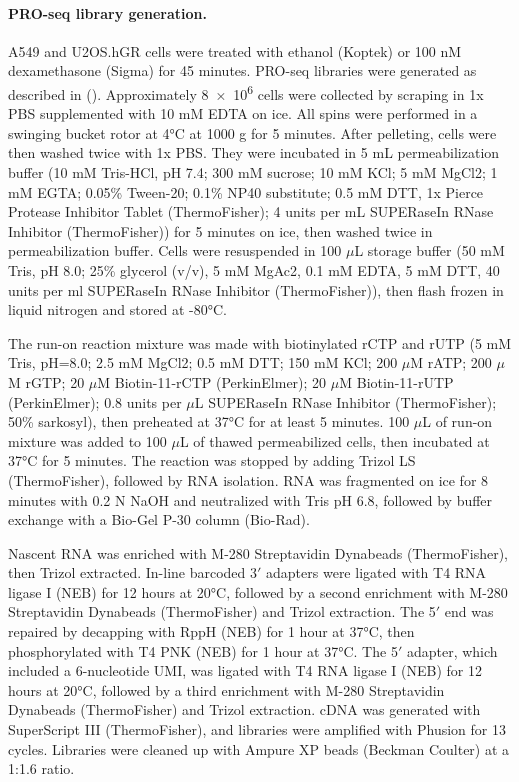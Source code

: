 \documentclass{article}
\begin{document}
{\paragraph{PRO-seq library generation.} A549 and U2OS.hGR cells were treated with ethanol (Koptek) or 100 nM dexamethasone (Sigma) for 45 minutes. PRO-seq libraries were generated as described in (\cite{mahat_base-pair-resolution_2016}). Approximately \num{8e6} cells were collected by scraping in 1x PBS supplemented with 10 mM EDTA on ice. All spins were performed in a swinging bucket rotor at 4°C at 1000 g for 5 minutes. After pelleting, cells were then washed twice with 1x PBS. They were incubated in 5 mL permeabilization buffer (10 mM Tris-HCl, pH 7.4; 300 mM sucrose; 10 mM KCl; 5 mM MgCl2; 1 mM EGTA; 0.05\% Tween-20; 0.1\% NP40 substitute; 0.5 mM DTT, 1x Pierce Protease Inhibitor Tablet (ThermoFisher); 4 units per mL SUPERaseIn RNase Inhibitor (ThermoFisher)) for 5 minutes on ice, then washed twice in permeabilization buffer. Cells were resuspended in 100 $\mu$L storage buffer (50 mM Tris, pH 8.0; 25\% glycerol (v/v), 5 mM MgAc2, 0.1 mM EDTA, 5 mM DTT, 40 units per ml SUPERaseIn RNase Inhibitor (ThermoFisher)), then flash frozen in liquid nitrogen and stored at -80°C.

The run-on reaction mixture was made with biotinylated rCTP and rUTP (5 mM Tris, pH=8.0; 2.5 mM MgCl2; 0.5 mM DTT; 150 mM KCl; 200 $\mu$M rATP; 200 $\mu$M rGTP; 20 $\mu$M Biotin-11-rCTP (PerkinElmer); 20 $\mu$M Biotin-11-rUTP (PerkinElmer); 0.8 units per $\mu$L SUPERaseIn RNase Inhibitor (ThermoFisher); 50\% sarkosyl), then preheated at 37°C for at least 5 minutes. 100 $\mu$L of run-on mixture was added to 100 $\mu$L of thawed permeabilized cells, then incubated at 37°C for 5 minutes. The reaction was stopped by adding Trizol LS (ThermoFisher), followed by RNA isolation. RNA was fragmented on ice for 8 minutes with 0.2 N NaOH and neutralized with Tris pH 6.8, followed by buffer exchange with a Bio-Gel P-30 column (Bio-Rad).

Nascent RNA was enriched with M-280 Streptavidin Dynabeads (ThermoFisher), then Trizol extracted. In-line barcoded 3$\prime$ adapters were ligated with T4 RNA ligase I (NEB) for 12 hours at 20°C, followed by a second enrichment with M-280 Streptavidin Dynabeads (ThermoFisher) and Trizol extraction. The 5$\prime$ end was repaired by decapping with RppH (NEB) for 1 hour at 37°C, then phosphorylated with T4 PNK (NEB) for 1 hour at 37°C. The 5$\prime$ adapter, which included a 6-nucleotide UMI, was ligated with T4 RNA ligase I (NEB) for 12 hours at 20°C, followed by a third enrichment with M-280 Streptavidin Dynabeads (ThermoFisher) and Trizol extraction. cDNA was generated with SuperScript III (ThermoFisher), and libraries were amplified with Phusion for 13 cycles. Libraries were cleaned up with Ampure XP beads (Beckman Coulter) at a 1:1.6 ratio.

}
\end{document}
